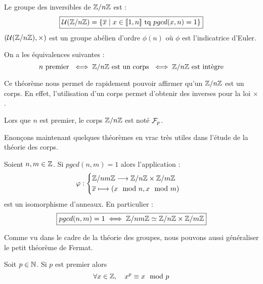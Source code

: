\begin{theorem}
    Le groupe des inversibles de $\mathbb{Z} / n \mathbb{Z}$ est : 
        \[ \boxed{ \mathcal{U}(\mathbb{Z} / n \mathbb{Z}) = \{ \overline{x} \; | \; x \in \llbracket 1, n \rrbracket \text{ tq } pgcd(x,n) = 1\} } \] 
    $(\mathcal{U}(\mathbb{Z} / n \mathbb{Z}), \times)$ est un groupe abélien d'ordre $\phi(n)$ où $\phi$ est l'indicatrice d'Euler. 
\end{theorem}

\begin{theorem}[Fondamental]
    On a les équivalences suivantes : 
        \[ n \text{ premier } \iff \mathbb{Z} / n \mathbb{Z} \text{ est un corps } \iff \mathbb{Z} / n \mathbb{Z} \text{ est intègre} \] 
\end{theorem}

Ce théorème nous permet de rapidement pouvoir affirmer qu'un $\mathbb{Z}/n\mathbb{Z}$ est un corps. 
En effet, l'utilisation d'un corps permet d'obtenir des inverses pour la loi $\times$. 

\begin{remark}[Notation]
    Lors que $n$ est premier, le corps $\mathbb{Z} / n \mathbb{Z}$ est noté $\mathcal{F}_p$. 
\end{remark}

Enonçons maintenant quelques théorèmes en vrac très utiles dans l'étude de la théorie des corps. 

\begin{theorem}
    Soient $n,m \in \mathbb{Z}$. Si $ pgcd(n,m) = 1$ alors l'application : 
        \[ \varphi : 
            \begin{cases}
                \mathbb{Z} /nm \mathbb{Z} \longrightarrow \mathbb{Z} /n \mathbb{Z} \times \mathbb{Z} / m \mathbb{Z} \\ 
                \overline{x} \longmapsto (x \mod n, x \mod m)
            \end{cases} \] 
    est un isomorphisme d'anneaux. En particulier : 
        \[ \boxed{ pgcd(n,m) = 1 \iff \mathbb{Z} /nm \mathbb{Z} \simeq \mathbb{Z} /n \mathbb{Z} \times \mathbb{Z} / m \mathbb{Z}  } \]
\end{theorem}

Comme vu dans le cadre de la théorie des groupes, nous pouvons aussi généraliser le petit théorème de Fermat. 

\begin{theorem}
    Soit $ p \in \mathbb{N}$. Si $p$ est premier alors 
        \[ \forall x \in \mathbb{Z}, \quad x^p \equiv x \mod p \] 
\end{theorem}


